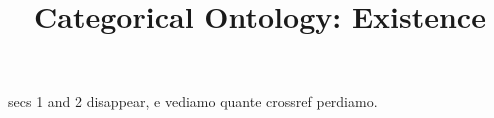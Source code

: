 \documentclass[a4paper]{../birkjour}
\title{Categorical Ontology: Existence}
\begin{document}

\maketitle

\tableofcontents
{\color{red} secs 1 and 2 disappear, e vediamo quante crossref perdiamo.}
  
  
  
  
  
  \appendix
  
 
  {}
  
\end{document}
